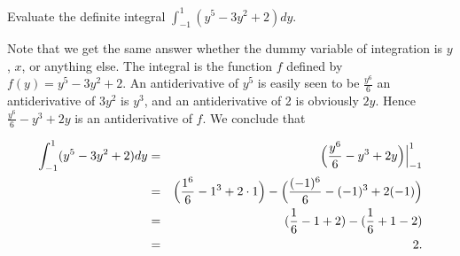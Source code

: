 \begin{example}
Evaluate the definite integral $\int_{-1}^{1} (y^5 - 3y^2 + 2) dy$.

Note that we get the same answer whether the dummy variable of integration is $y$, $x$, or anything else. The integral is the function $f$ defined by $f(y) = y^5 - 3y^2 + 2$. An antiderivative of $y^5$ is easily seen to be $\frac{y^6}{6}$ an antiderivative of $3y^2$ is $y^3$, and an antiderivative  of 2 is obviously $2y$. Hence $\frac{y^6}{6}  - y^3 + 2y$ is an antiderivative of $f$. We conclude that

\begin{eqnarray*}
\int_{-1}^{1} (y^5 - 3y^2 + 2) dy &=& \Bigl( \frac{y^6}{6} - y^3 + 2y \Bigr) \Big|_{-1}^{1}\\
&=& \Bigl( \frac{1^6}{6} - 1^3 + 2 \cdot 1 \Bigr) - \Bigl( \frac{( -1)^6}{6} - (- 1)^3 + 2(- 1) \Bigr) \\
&=& (\frac{1}{6} -1 + 2) - (\frac{1}{6} + 1 - 2)\\
&=& 2.
\end{eqnarray*}
\end{example}


